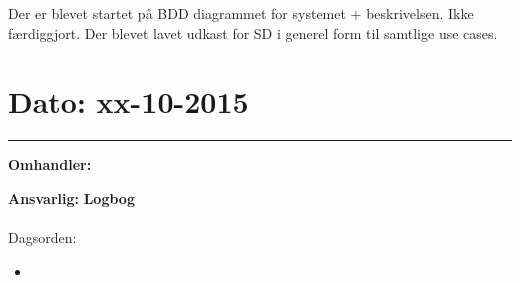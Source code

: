 Der er blevet startet på BDD diagrammet for systemet + beskrivelsen. Ikke færdiggjort.
Der blevet lavet udkast for SD i generel form til samtlige use cases. 


\section{Dato: xx-10-2015 }
\hrule

\textbf{Omhandler:}   

\textbf{Ansvarlig:} 
\textbf{Logbog}
\\
\\
Dagsorden:
\begin{itemize}
	\item 
\end{itemize}

